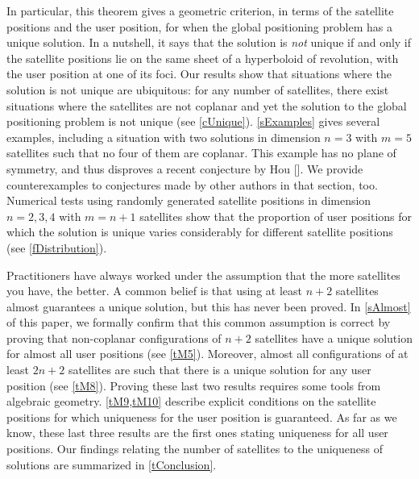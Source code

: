 \documentclass[reqno]{amsart}
\begin{document}
In particular, this theorem gives a geometric criterion, in terms of the satellite positions and the user position, for when the global positioning problem has a unique solution. In a nutshell, it says that the solution is {\em not} unique if and only if the satellite positions lie on the same sheet of a hyperboloid of revolution, with the user position at one of its foci. 
Our results show that situations where the solution is not unique are ubiquitous: for any number of satellites, there exist situations where the satellites are not coplanar and yet the solution to the global positioning problem is not unique (see \cref{cUnique}). 
\cref{sExamples} gives several examples, including a situation with two solutions in dimension $n=3$ with $m=5$ satellites such that no four of them are coplanar. This example has no plane of symmetry, and thus disproves a recent conjecture by Hou []. We provide counterexamples to conjectures made by other authors in that section, too.
Numerical tests using randomly generated satellite positions in dimension $n=2, 3, 4$ with $m=n+1$ satellites
show that the proportion of user positions for which the solution is unique varies considerably for different satellite positions (see \cref{fDistribution}).

Practitioners have always worked under the assumption that the more satellites you have, the better. A common belief is that using at least $n+2$ satellites almost guarantees a unique solution, but this has never been proved. In \cref{sAlmost} of this paper, we formally confirm that this common assumption is correct by proving that non-coplanar configurations of $n+2$ satellites have a unique solution for almost all user positions (see \cref{tM5}).
Moreover, almost all configurations of at least $2 n + 2$ satellites are such that there is a unique solution for any user position (see \cref{tM8}).  Proving these last two results requires some tools from algebraic geometry.  \cref{tM9,tM10} describe explicit conditions on the satellite positions for which uniqueness for the user position is guaranteed. As far as we know, these last three results are the first ones stating uniqueness for all user positions. Our findings relating the number of satellites to the uniqueness of solutions are summarized in \cref{tConclusion}. 
\end{document}
